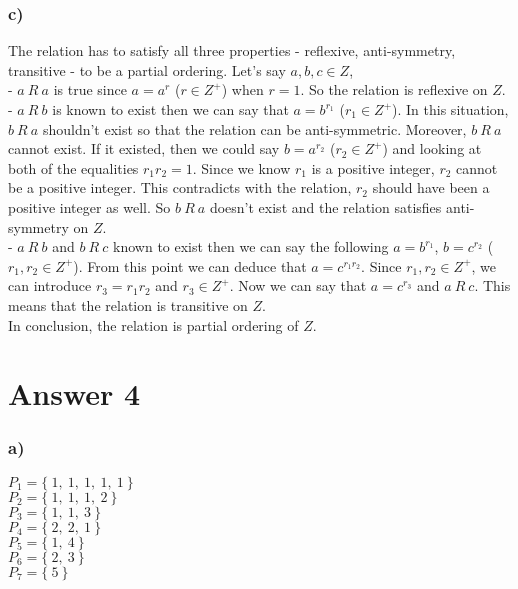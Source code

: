 \documentclass[12pt]{article}
\begin{document}
\subsubsection*{c)}
The relation has to satisfy all three properties - reflexive, anti-symmetry, transitive - to be a partial ordering. Let's say $a, b, c \in Z$, \\ 
- $a\ R\ a$ is true since $a=a^r$ ($r \in Z^+$) when $r=1$. So the relation is reflexive on $Z$.\\
- $a\ R\ b$ is known to exist then we can say that $a=b^{r_1}$ ($r_1 \in Z^+$). In this situation, $b\ R\ a$ shouldn't exist so that the relation can be anti-symmetric. Moreover, $b\ R\ a$ cannot exist. If it existed, then we could say $b=a^{r_2}$ ($r_2 \in Z^+$) and looking at both of the equalities $r_1r_2=1$. Since we know $r_1$ is a positive integer, $r_2$ cannot be a positive integer. This contradicts with the relation, $r_2$ should have been a positive integer as well. So $b\ R\ a$ doesn't exist and the relation satisfies anti-symmetry on $Z$. \\
- $a\ R\ b$ and $b\ R\ c$ known to exist then we can say the following $a=b^{r_1}$, $b=c^{r_2}$ ($r_1,r_2 \in Z^+$). From this point we can deduce that $a=c^{r_1r_2}$. Since $r_1,r_2 \in Z^+$, we can introduce $r_3=r_1r_2$ and $r_3 \in Z^+$. Now we can say that $a=c^{r_3}$ and $a\ R\ c$. This means that the relation is transitive on $Z$. \\
In conclusion, the relation is partial ordering of $Z$.
\section*{Answer 4}
\subsubsection*{a)}
$P_1=\{\ 1,\ 1,\ 1,\ 1,\ 1\ \}$ \\
$P_2=\{\ 1,\ 1,\ 1,\ 2\ \}$ \\
$P_3=\{\ 1,\ 1,\ 3\ \}$ \\
$P_4=\{\ 2,\ 2,\ 1\ \}$ \\
$P_5=\{\ 1,\ 4\ \}$ \\
$P_6=\{\ 2,\ 3\ \}$ \\
$P_7=\{\ 5\ \}$ \\
\end{document}
